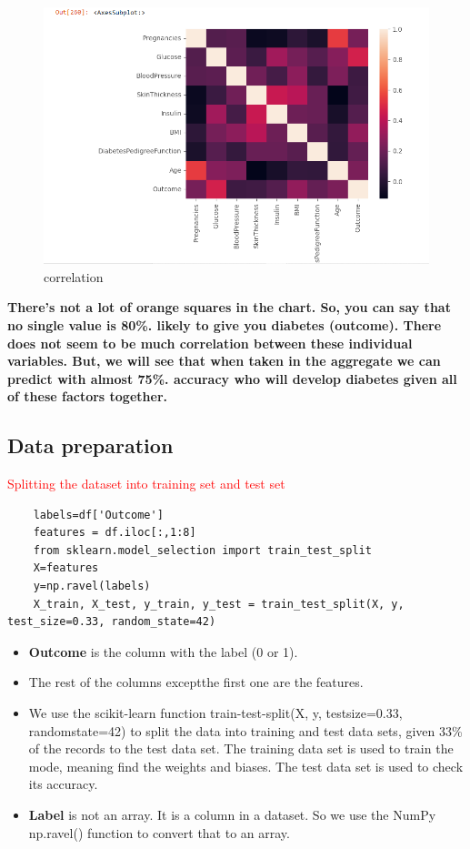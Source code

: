     \begin{figure}[htp]
        \centering
        \includegraphics[width=1.1\textwidth]{images/correlation.png}
        \caption{correlation }
        \label{fig:example3}
    \end{figure}
    
   \textbf{There’s not a lot of orange squares in the chart. 
    So, you can say that no single value is 80\%. 
    likely to give you diabetes (outcome). 
    There does not seem to be much correlation between these
     individual variables. But, we will see that when taken in 
     the aggregate we can predict with almost 75\%. accuracy 
    who will develop diabetes given all of these factors together.
   }
\subsection{Data preparation}
\label{sec:data}
\textcolor{red}{Splitting the dataset into training set and test set}
\begin{lstlisting}
    labels=df['Outcome']
    features = df.iloc[:,1:8]
    from sklearn.model_selection import train_test_split
    X=features
    y=np.ravel(labels)
    X_train, X_test, y_train, y_test = train_test_split(X, y, test_size=0.33, random_state=42) 
 \end{lstlisting}

 \begin{itemize}
    \item\textbf{Outcome} is the column with the label (0 or 1). 
    \item The rest of the columns exceptthe first one are the features.
    \item We use the scikit-learn function train-test-split(X, y, testsize=0.33, randomstate=42) to split the data into training and test data sets, given 33\% of the records to the test data set. The training data set is used to train the mode, meaning find the weights and biases. The test data set is used to check its accuracy.
    \item \textbf{Label} is not an array. It is a column in a dataset. So we use the NumPy np.ravel() function to convert that to an array.
\end{itemize}
 
